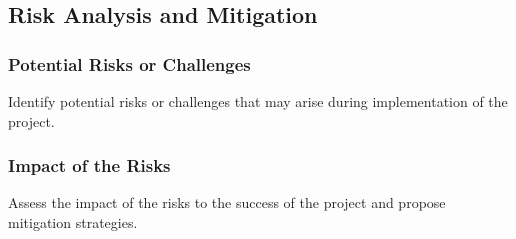 \subsection{Risk Analysis and Mitigation}
\subsubsection{Potential Risks or Challenges}
Identify potential risks or challenges that may arise during implementation of the project.
\subsubsection{Impact of the Risks}
Assess the impact of the risks to the success of the project and propose mitigation strategies.